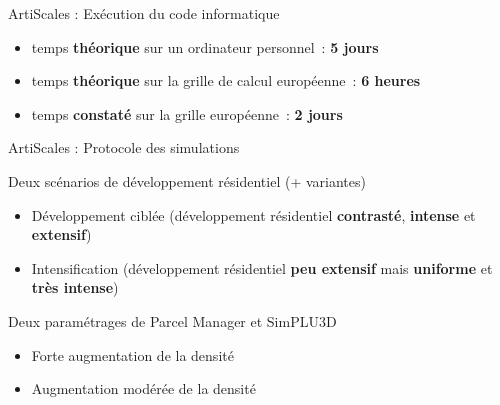 \documentclass[xcolor=table]{beamer}
\begin{document}
\begin{frame}{ArtiScales : Exécution du code informatique}
	\begin{itemize}
		\item temps \textbf{théorique} sur un ordinateur personnel~: \textbf{5 jours}
		\item temps \textbf{théorique} sur la grille de calcul européenne~: \textbf{6 heures}
		\item temps \textbf{constaté} sur la grille européenne~: \textbf{2 jours}
	\end{itemize}
\end{frame}

\begin{frame}{ArtiScales : Protocole des simulations}
	\begin{block}{Deux scénarios de développement résidentiel (+ variantes)}
		\begin{itemize}
			\small
			\item Développement ciblée (développement résidentiel \textbf{contrasté}, \textbf{intense} et \textbf{extensif})
			\item Intensification (développement résidentiel \textbf{peu extensif} mais \textbf{uniforme} et \textbf{très intense})
		\end{itemize}
	\end{block}
	\begin{block}{Deux paramétrages de Parcel Manager et SimPLU3D}
	\begin{itemize}
		\small
		\item Forte augmentation de la densité
		\item Augmentation modérée de la densité
	\end{itemize}
	\end{block}
\end{frame}
\end{document}
